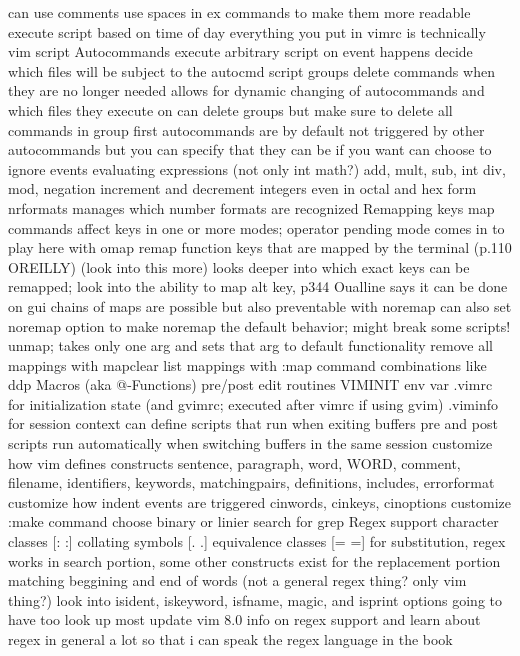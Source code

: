 \documentclass[12pt]{book}
\begin{document}
{{      can use comments
      use spaces in ex commands to make them more readable
    execute script based on time of day
    everything you put in vimrc is technically vim script
    Autocommands
      execute arbitrary script on event happens
      decide which files will be subject to the autocmd script
      groups
      delete commands when they are no longer needed
        allows for dynamic changing of autocommands and which files they execute on
      can delete groups but make sure to delete all commands in group first
      autocommands are by default not triggered by other autocommands but you can specify that they can be if you want
      can choose to ignore events
    evaluating expressions (not only int math?)
      add, mult, sub, int div, mod, negation
    increment and decrement integers even in octal and hex form
      nrformats manages which number formats are recognized
  Remapping keys
    map commands affect keys in one or more modes; operator pending mode comes in to play here with omap
    remap function keys that are mapped by the terminal (p.110 OREILLY) (look into this more)
      looks deeper into which exact keys can be remapped; look into the ability to map alt key, p344 Oualline says it can be done on gui
    chains of maps are possible but also preventable with noremap
      can also set noremap option to make noremap the default behavior; might break some scripts!
    unmap; takes only one arg and sets that arg to default functionality
    remove all mappings with mapclear
    list mappings with :map
  command combinations like ddp
  Macros (aka @-Functions)
  pre/post edit routines
    VIMINIT env var
    .vimrc for initialization state (and gvimrc; executed after vimrc if using gvim)
    .viminfo for session context
    can define scripts that run when exiting buffers
    pre and post scripts run automatically when switching buffers in the same session
  customize how vim defines constructs
    sentence, paragraph, word, WORD, comment, filename, identifiers, keywords, matchingpairs, definitions, includes, errorformat
  customize how indent events are triggered
    cinwords, cinkeys, cinoptions
  customize :make command
  choose binary or linier search for grep
Regex support
  character classes [: :]
  collating symbols [. .]
  equivalence classes [= =]
  for substitution, regex works in search portion, some other constructs exist for the replacement portion
  matching beggining and end of words (not a general regex thing? only vim thing?)
  look into isident, iskeyword, isfname, magic, and isprint options
  going to have too look up most update vim 8.0 info on regex support and learn about regex in general a lot so that i can speak the regex language in the book
}}
\end{document}

